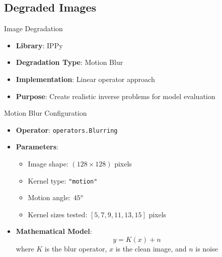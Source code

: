 \subsection{Degraded Images}

\begin{frame}{Image Degradation}
    \begin{itemize}
        \item \textbf{Library}: IPPy
        \item \textbf{Degradation Type}: Motion Blur
        \item \textbf{Implementation}: Linear operator approach
        \item \textbf{Purpose}: Create realistic inverse problems for model evaluation
    \end{itemize}
\end{frame}

\begin{frame}{Motion Blur Configuration}
    \begin{itemize}
        \item \textbf{Operator}: \texttt{operators.Blurring}
        \item \textbf{Parameters}:
              \begin{itemize}
                  \item Image shape: $(128 \times 128)$ pixels
                  \item Kernel type: \texttt{"motion"}
                  \item Motion angle: $45\degree$
                  \item Kernel sizes tested: $[5, 7, 9, 11, 13, 15]$ pixels
              \end{itemize}
        \item \textbf{Mathematical Model}:
              \begin{equation}
                  y = K(x) + n
              \end{equation}
              where $K$ is the blur operator, $x$ is the clean image, and $n$ is noise
    \end{itemize}
\end{frame}
